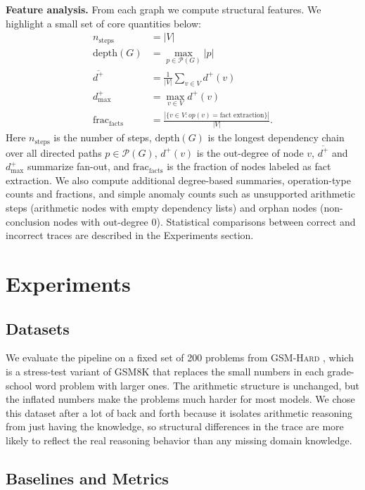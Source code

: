 \documentclass[letterpaper]{article}
\begin{document}
\noindent \textbf{Feature analysis.} From each graph we compute structural features. We highlight a small set of core quantities below:
\begin{align}
 n_{\text{steps}} &= |V| \\
 \text{depth}(G) &= \max_{p \in \mathcal{P}(G)} |p| \\
 \overline{d^{+}} &= \frac{1}{|V|}\sum_{v\in V} d^{+}(v) \\
 d^{+}_{\max} &= \max_{v\in V} d^{+}(v) \\
 \text{frac}_{\text{facts}} &= \frac{|\{v \in V : op(v)=\text{fact extraction}\}|}{|V|}.
\end{align}
Here \(n_{\text{steps}}\) is the number of steps, \(\text{depth}(G)\) is the longest dependency chain over all directed paths \(p \in \mathcal{P}(G)\), \(d^{+}(v)\) is the out-degree of node \(v\), \(\overline{d^{+}}\) and \(d^{+}_{\max}\) summarize fan-out, and \(\text{frac}_{\text{facts}}\) is the fraction of nodes labeled as fact extraction.
We also compute additional degree-based summaries, operation-type counts and fractions, and simple anomaly counts such as unsupported arithmetic steps (arithmetic nodes with empty dependency lists) and orphan nodes (non-conclusion nodes with out-degree \(0\)). Statistical comparisons between correct and incorrect traces are described in the Experiments section.

\section{Experiments}

\subsection{Datasets}

We evaluate the pipeline on a fixed set of 200 problems from
\textsc{GSM-Hard} \cite{gao2023palprogramaidedlanguagemodels}, which is a stress-test variant of GSM8K \cite{cobbe2021trainingverifierssolvemath}
that replaces the small numbers in each grade-school word problem
with larger ones. The arithmetic structure is unchanged, but
the inflated numbers make the problems much harder for most models. We chose this dataset after a lot of back and forth because it isolates arithmetic reasoning from just having the knowledge, so
structural differences in the trace are more likely to reflect
the real reasoning behavior than any missing domain knowledge.


\subsection{Baselines and Metrics}
\end{document}
